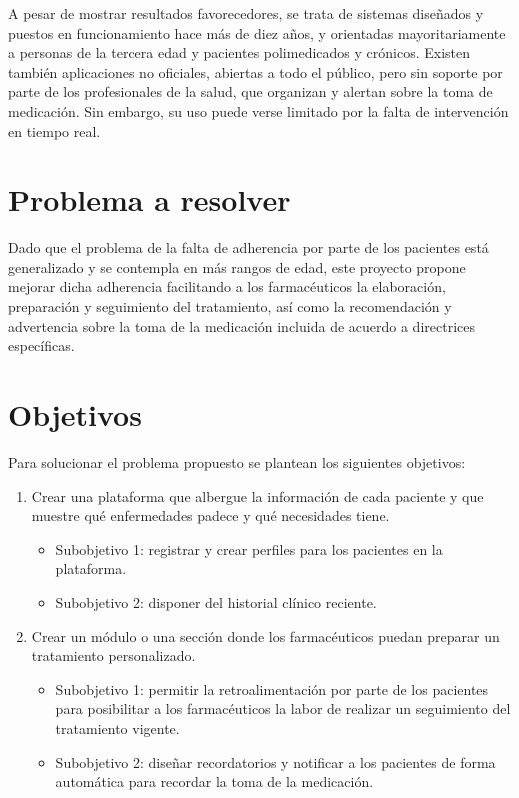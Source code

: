 A pesar de mostrar resultados favorecedores, se trata de sistemas diseñados y puestos en funcionamiento hace más de diez años, y orientadas mayoritariamente a personas de la tercera edad y pacientes polimedicados y crónicos. Existen también aplicaciones no oficiales, abiertas a todo el público, pero sin soporte por parte de los profesionales de la salud, que organizan y alertan sobre la toma de medicación. Sin embargo, su uso puede verse limitado por la falta de intervención en tiempo real. 

\section{Problema a resolver}

Dado que el problema de la falta de adherencia por parte de los pacientes está generalizado y se contempla en más rangos de edad, este proyecto propone mejorar dicha adherencia facilitando a los farmacéuticos la elaboración, preparación y seguimiento del tratamiento, así como la recomendación y advertencia sobre la toma de la medicación incluida de acuerdo a directrices específicas. 

\section{Objetivos}
Para solucionar el problema propuesto se plantean los siguientes objetivos:

	\begin{enumerate}
		\item Crear una plataforma que albergue la información de cada paciente y que muestre qué enfermedades padece y qué necesidades tiene.
		\begin{itemize}
			\item Subobjetivo 1: registrar y crear perfiles para los pacientes en la plataforma.
			
			\item Subobjetivo 2: disponer del historial clínico reciente.
		\end{itemize}
	
		\item Crear un módulo o una sección donde los farmacéuticos puedan preparar un tratamiento personalizado.
			\begin{itemize}
				\item Subobjetivo 1: permitir la retroalimentación por parte de los pacientes para posibilitar a los farmacéuticos la labor de realizar un seguimiento del tratamiento vigente.
				
				\item Subobjetivo 2: diseñar recordatorios y notificar a los pacientes de forma automática para recordar la toma de la medicación.
				
			\end{itemize}
		
	\end{enumerate}
